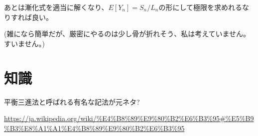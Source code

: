 \documentclass[a4paper, 10pt, dvipdfmx]{jlreq}
\begin{document}
あとは漸化式を適当に解くなり、$E[Y_n]=S_n / L_n$の形にして極限を求めれるなりすれば良い。

(雑になら簡単だが、厳密にやるのは少し骨が折れそう、私は考えていません。すいません。)

\section{知識}

平衡三進法と呼ばれる有名な記法が元ネタ?

\url{https://ja.wikipedia.org/wiki/%E4%B8%89%E9%80%B2%E6%B3%95#%E5%B9%B3%E8%A1%A1%E4%B8%89%E9%80%B2%E6%B3%95}
\end{document}
